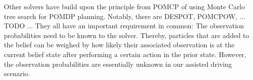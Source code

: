






Other solvers have build upon the principle from POMCP of using Monte Carlo tree search for POMDP planning. 
Notably, there are DESPOT, POMCPOW, ... TODO ...
They all have an important requirement in common: The observation probabilities need to be known to the solver. Thereby, particles that are added to the belief can be weighed by how likely their associated observation is at the current belief state after performing a certain action in the prior state. However, the observation probabilities are essentially unknown in our assisted driving scenario. 


